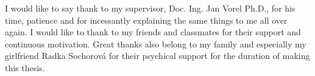 \newpage\null \vfill \noindent\thispagestyle{empty}{\bf\Large
Acknowledgment}
\bigskip


I would like to say thank to my supervisor, Doc. Ing. Jan Vorel Ph.D., for his time, patience and for incessantly explaining the same things to me all over again. I would like to thank to my friends and classmates for their support and continuous motivation. Great thanks also belong to my family and especially my girlfriend Radka Sochorová for their psychical support for the duration of making this thesis. 

\newpage

